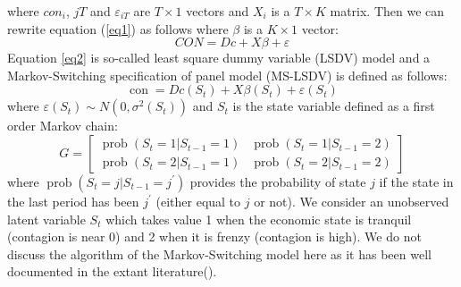 \documentclass{article}
\begin{document}
where $con_{i}$, $jT$ and $\varepsilon_{iT}$ are $T \times 1$ vectors and $X_{i}$ is a $T \times K$ matrix. Then we can rewrite equation (\ref{eq1}) as follows where $\beta$ is a $K \times 1$ vector:  
\begin{equation}
CON = Dc + X\beta + \varepsilon
\label{eq2}
\end{equation}
Equation \ref{eq2} is so-called least square dummy variable (LSDV) model and a Markov-Switching specification of panel model (MS-LSDV) is defined as follows: 
\begin{equation}
\operatorname{con}=D c(S_{t})+X \beta(S_{t})+\varepsilon(S_{t})
\label{eq3}
\end{equation}
where $\varepsilon(S_{t}) \sim N(0, \sigma^{2}(S_{t}))$ and $S_{t}$ is the state variable defined as a first order Markov chain:  
\begin{equation}
G=\left[\begin{array}{ll}{\operatorname{prob}\left(S_{t}=1 | S_{t-1}=1\right)} & {\operatorname{prob}\left(S_{t}=1 | S_{t-1}=2\right)} \\ {\operatorname{prob}\left(S_{t}=2 | S_{t-1}=1\right)} & {\operatorname{prob}\left(S_{t}=2 | S_{t-1}=2\right)}\end{array}\right]
\label{eq4}
\end{equation}
where $\operatorname{prob}\left(S_{t}=j | S_{t-1}=j^{\prime}\right)$ provides the probability of state $j$ if the state in the last period has been $j^{\prime}$ (either equal to $j$ or not). We consider an unobserved latent variable $S_{t}$ which takes value 1 when the economic state is tranquil (contagion is near 0) and 2 when it is frenzy (contagion is high). We do not discuss the algorithm of the Markov-Switching model here as it has been well documented in the extant literature(\cite{hansen1992likelihood,hansen1996erratum,quandt1972new,goldfeld1973markov}).  
\end{document}
